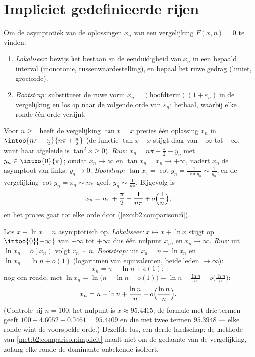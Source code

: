 \section{Impliciet gedefinieerde rijen}

\begin{method}\label{met:b2:comparison:implicit}
Om de asymptotiek van de oplossingen $x_n$ van een vergelijking
$F(x, n) = 0$ te vinden:
\begin{enumerate}
  \item \emph{Lokaliseer}: bewijs het bestaan en de eenduidigheid
        van $x_n$ in een bepaald interval (monotonie,
        tussenwaardestelling), en bepaal het ruwe gedrag (limiet,
        groeiorde).
  \item \emph{Bootstrap}: substitueer de ruwe vorm $x_n =
        (\text{hoofdterm})(1 + \varepsilon_n)$ in de vergelijking
        en los op naar de volgende orde van $\varepsilon_n$;
        herhaal, waarbij elke ronde één orde verfijnt.
\end{enumerate}
\end{method}

\begin{example}\label{ex:b2:comparison:tan}
Voor $n \geq 1$ heeft de vergelijking $\tan x = x$ precies één
oplossing $x_n$ in $\intoo{n\pi - \frac\pi2}{n\pi + \frac\pi2}$
(de functie $\tan x - x$ stijgt daar van $-\infty$ tot $+\infty$,
want haar afgeleide is $\tan^2 x \geq 0$). \emph{Ruw:} $x_n = n\pi
+ \frac\pi2 - y_n$ met $y_n \in \intoo{0}{\pi}$; omdat $x_n \to
\infty$ en $\tan x_n = x_n \to +\infty$, nadert $x_n$ de asymptoot
van links: $y_n \to 0$. \emph{Bootstrap:} $\tan x_n = \cot y_n =
\frac{1}{\tan y_n} \sim \frac{1}{y_n}$, en de vergelijking $\cot
y_n = x_n \sim n\pi$ geeft $y_n \sim \frac{1}{n\pi}$. Bijgevolg is
\[
x_n = n\pi + \frac\pi2 - \frac{1}{n\pi} +
o\Bigl(\frac1n\Bigr),
\]
en het proces gaat tot elke orde door
(\cref{exo:b2:comparison:6}).
\end{example}

\begin{example}\label{ex:b2:comparison:xplusln}
Los $x + \ln x = n$ asymptotisch op. \emph{Lokaliseer:} $x \mapsto
x + \ln x$ stijgt op $\intoo{0}{+\infty}$ van $-\infty$ tot
$+\infty$: dus één nulpunt $x_n$, en $x_n \to \infty$. \emph{Ruw:}
uit $\ln x_n = o(x_n)$ volgt $x_n \sim n$. \emph{Bootstrap:} uit
$x_n = n - \ln x_n$ en $\ln x_n = \ln n + o(1)$ (logaritmen van
equivalenten, beide leden $\to \infty$):
\[
x_n = n - \ln n + o(1) ;
\]
nog een ronde, met $\ln x_n = \ln\bigl(n - \ln n + o(1)\bigr) =
\ln n - \frac{\ln n}{n} + o\bigl(\frac{\ln n}n\bigr)$:
\[
x_n = n - \ln n + \frac{\ln n}{n} +
o\Bigl(\frac{\ln n}{n}\Bigr).
\]
(Controle bij $n = 100$: het nulpunt is $x \approx 95.4415$; de
formule met drie termen geeft $100 - 4.6052 + 0.0461 = 95.4409$ en
die met twee termen $95.3948$ --- elke ronde wint de voorspelde
orde.) Dezelfde lus, een derde landschap: de methode van
\cref{met:b2:comparison:implicit} maalt niet om de gedaante van de
vergelijking, zolang elke ronde de dominante onbekende isoleert.
\end{example}

